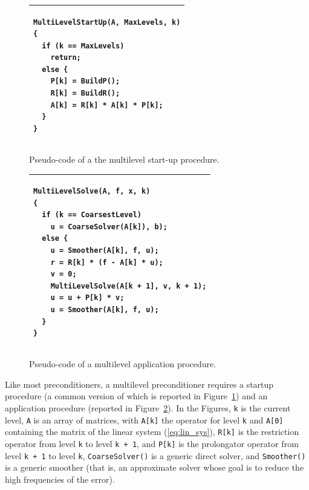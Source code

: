 \documentclass{article}[11pt]
\begin{document}
\begin{figure}
\begin{center}
\begin{tabular}{ p{12cm} }
\hline
\vspace*{0.1cm}
\hspace*{1cm}
\begin{minipage}{10cm}
\begin{verbatim}
MultiLevelStartUp(A, MaxLevels, k)
{
  if (k == MaxLevels)
    return;
  else {
    P[k] = BuildP(); 
    R[k] = BuildR();
    A[k] = R[k] * A[k] * P[k];
  }
}
\end{verbatim}
\vspace*{0.1cm}
\end{minipage} \\
\hline
\end{tabular}
\caption{Pseudo-code of a the multilevel start-up procedure.}
\label{fig:startup}
\end{center}
\end{figure}

\begin{figure}
\begin{center}
\begin{tabular}{ p{12cm} }
\hline
\vspace*{0.1cm}
\hspace*{1cm}
\begin{minipage}{10cm}
\begin{verbatim}
MultiLevelSolve(A, f, x, k) 
{
  if (k == CoarsestLevel)
    u = CoarseSolver(A[k]), b);
  else {
    u = Smoother(A[k], f, u);
    r = R[k] * (f - A[k] * u);
    v = 0;
    MultiLevelSolve(A[k + 1], v, k + 1);
    u = u + P[k] * v;
    u = Smoother(A[k], f, u);
  }
}
\end{verbatim}
\vspace*{0.1cm}
\end{minipage} \\
\hline
\end{tabular}
\caption{Pseudo-code of a multilevel application procedure.}
\label{fig:application}
\end{center}
\end{figure}

Like most preconditioners, a multilevel preconditioner requires a startup 
procedure (a common version of which is reported in Figure~\ref{fig:startup})
  and an application procedure (reported in Figure~\ref{fig:application}).
In the Figures, \verb!k! is the current level,
\verb!A! is an array of matrices, with \verb!A[k]! the operator for 
level \verb!k! and \verb!A[0]! containing the matrix of the linear system 
(\ref{eq:lin_sys}), 
\verb!R[k]! is the restriction operator from level \verb!k! 
to level \verb!k + 1!, and \verb!P[k]! is the prolongator
operator from level \verb!k + 1! to level \verb!k!,
\verb!CoarseSolver()! is a generic direct solver, and
\verb!Smoother()! is a generic smoother (that is, an approximate solver
whose goal is to reduce the high frequencies of the error).
\end{document}
